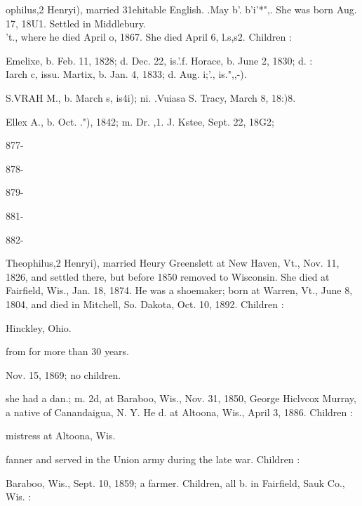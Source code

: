 \documentclass{book}
\begin{document}
ophilus,2 Henryi), married 31ehitable English. .May b'. b'i'*",. 
She was born Aug. 17, 18U1. Settled in Middlebury. \\'t., where 
he died April o, 1867. She died April 6, l.s,s2. Children : 

Emelixe, b. Feb. 11, 1828; d. Dec. 22, is.'.f. 
Horace, b. June 2, 1830; d. :\\Iarch c, issu. 
Martix, b. Jan. 4, 1833; d. Aug. i;'., is.",,-). 

S.VRAH M., b. March s, is4i); ni. .Vuiasa S. Tracy, March 8, 
18:)8. 

Ellex A., b. Oct. ."), 1842; m. Dr. ,1. J. Kstee, Sept. 22, 18G2; 



877- 




878- 




879- 






881- 




882- 






Theophilus,2 Henryi), married Heury Greenslett at New Haven, 
Vt., Nov. 11, 1826, and settled there, but before 1850 removed 
to Wisconsin. She died at Fairfield, Wis., Jan. 18, 1874. He 
was a shoemaker; born at Warren, Vt., June 8, 1804, and died 
in Mitchell, So. Dakota, Oct. 10, 1892. Children : 


Hinckley, Ohio. 



from for more than 30 years. 






Nov. 15, 1869; no children. 


she had a dan.; m. 2d, at Baraboo, Wis., Nov. 31, 1850, 
George Hiclvcox Murray, a native of Canandaigua, N. Y. He 
d. at Altoona, Wis., April 3, 1886. Children : 








mistress at Altoona, Wis. 


fanner and served in the Union army during the late war. 
Children : 





Baraboo, Wis., Sept. 10, 1859; a farmer. Children, all b. in 
Fairfield, Sauk Co., Wis. : 
\end{document}
